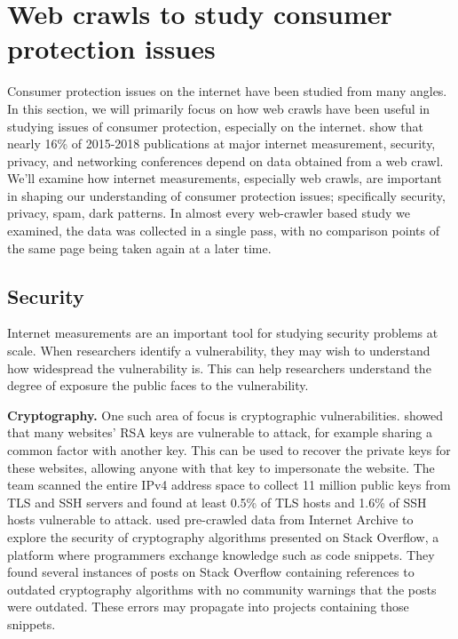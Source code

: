 \section{Web crawls to study consumer protection issues} \label{sec:background:crawls}
Consumer protection issues on the internet have been studied from many angles. In this section, we will primarily focus on how web crawls have been useful in studying issues of consumer protection, especially on the internet. \citet{ahmad2020apophanies} show that nearly 16\% of 2015-2018 publications at major internet measurement, security, privacy, and networking conferences depend on data obtained from a web crawl. We'll examine how internet measurements, especially web crawls, are important in shaping our understanding of consumer protection issues; specifically security, privacy, spam, dark patterns. In almost every web-crawler based study we examined, the data was collected in a single pass, with no comparison points of the same page being taken again at a later time.

\subsection{Security}
Internet measurements are an important tool for studying security problems at scale. When researchers identify a vulnerability, they may wish to understand how widespread the vulnerability is. This can help researchers understand the degree of exposure the public faces to the vulnerability.

\textbf{Cryptography.} One such area of focus is cryptographic vulnerabilities. \citet{heninger2012mining} showed that many websites' RSA keys are vulnerable to attack, for example sharing a common factor with another key. This can be used to recover the private keys for these websites, allowing anyone with that key to impersonate the website. The team scanned the entire IPv4 address space to collect 11 million public keys from TLS and SSH servers and found at least 0.5\% of TLS hosts and 1.6\% of SSH hosts vulnerable to attack. \citet{kharche2021study} used pre-crawled data from Internet Archive to explore the security of cryptography algorithms presented on Stack Overflow, a platform where programmers exchange knowledge such as code snippets. They found several instances of posts on Stack Overflow containing references to outdated cryptography algorithms with no community warnings that the posts were outdated. These errors may propagate into projects containing those snippets.
 
